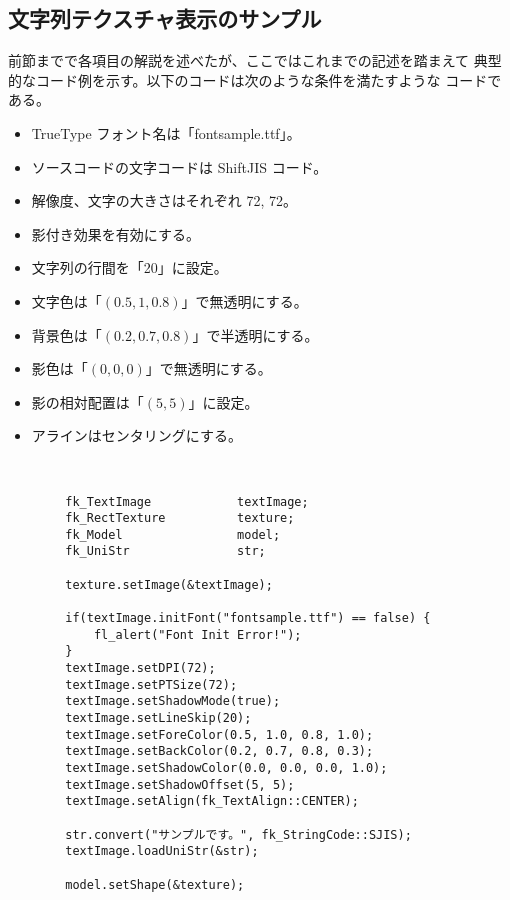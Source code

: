 \subsection{文字列テクスチャ表示のサンプル}
前節までで各項目の解説を述べたが、ここではこれまでの記述を踏まえて
典型的なコード例を示す。以下のコードは次のような条件を満たすような
コードである。
\begin{itemize}
 \item TrueType フォント名は「fontsample.ttf」。
 \item ソースコードの文字コードは ShiftJIS コード。
 \item 解像度、文字の大きさはそれぞれ 72, 72。
 \item 影付き効果を有効にする。
 \item 文字列の行間を「20」に設定。
 \item 文字色は「\((0.5, 1, 0.8)\)」で無透明にする。
 \item 背景色は「\((0.2, 0.7, 0.8)\)」で半透明にする。
 \item 影色は「\((0, 0, 0)\)」で無透明にする。
 \item 影の相対配置は「\((5, 5)\)」に設定。
 \item アラインはセンタリングにする。
\end{itemize}
~ \\
\begin{breakbox}
\begin{verbatim}
        fk_TextImage            textImage;
        fk_RectTexture          texture;
        fk_Model                model;
        fk_UniStr               str;

        texture.setImage(&textImage);

        if(textImage.initFont("fontsample.ttf") == false) {
            fl_alert("Font Init Error!");
        }
        textImage.setDPI(72);
        textImage.setPTSize(72);
        textImage.setShadowMode(true);
        textImage.setLineSkip(20);
        textImage.setForeColor(0.5, 1.0, 0.8, 1.0);
        textImage.setBackColor(0.2, 0.7, 0.8, 0.3);
        textImage.setShadowColor(0.0, 0.0, 0.0, 1.0);
        textImage.setShadowOffset(5, 5);
        textImage.setAlign(fk_TextAlign::CENTER);

        str.convert("サンプルです。", fk_StringCode::SJIS);
        textImage.loadUniStr(&str);

        model.setShape(&texture);
\end{verbatim}
\end{breakbox}

